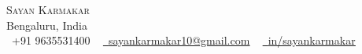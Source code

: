 \documentclass[letterpaper,11pt]{article}
\begin{document}
%

\begin{center}
    {\Huge \scshape \color{qccolor} {Sayan Karmakar}} \\ \vspace{1pt}
    Bengaluru, India \\ \vspace{1pt}
    \small \raisebox{-0.1\height}\faPhone\ +91 9635531400 ~ \href{mailto:sayankarmakar10@gmail.com}{\raisebox{-0.2\height}\faEnvelope\  \underline{sayankarmakar10@gmail.com}} ~
    \href{https://www.linkedin.com/in/sayankarmakar/}{\raisebox{-0.2\height}\faLinkedin\ \underline{in/sayankarmakar}} ~
    \vspace{-8pt}
\end{center}



\end{document}
